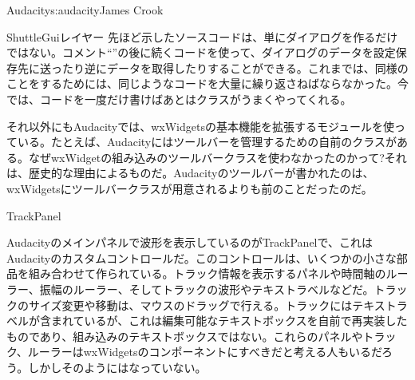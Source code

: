 \begin{aosachapter}{Audacity}{s:audacity}{James Crook}
\begin{aosasect1}{ShuttleGuiレイヤー}
先ほど示したソースコードは、単にダイアログを作るだけではない。コメント``''の後に続くコードを使って、ダイアログのデータを設定保存先に送ったり逆にデータを取得したりすることができる。これまでは、同様のことをするためには、同じようなコードを大量に繰り返さねばならなかった。今では、コードを一度だけ書けばあとはクラスがうまくやってくれる。

それ以外にもAudacityでは、wxWidgetsの基本機能を拡張するモジュールを使っている。たとえば、Audacityにはツールバーを管理するための自前のクラスがある。なぜwxWidgetの組み込みのツールバークラスを使わなかったのかって?それは、歴史的な理由によるものだ。Audacityのツールバーが書かれたのは、wxWidgetsにツールバークラスが用意されるよりも前のことだったのだ。

\end{aosasect1}

\begin{aosasect1}{TrackPanel}

Audacityのメインパネルで波形を表示しているのがTrackPanelで、これはAudacityのカスタムコントロールだ。このコントロールは、いくつかの小さな部品を組み合わせて作られている。トラック情報を表示するパネルや時間軸のルーラー、振幅のルーラー、そしてトラックの波形やテキストラベルなどだ。トラックのサイズ変更や移動は、マウスのドラッグで行える。トラックにはテキストラベルが含まれているが、これは編集可能なテキストボックスを自前で再実装したものであり、組み込みのテキストボックスではない。これらのパネルやトラック、ルーラーはwxWidgetsのコンポーネントにすべきだと考える人もいるだろう。しかしそのようにはなっていない。


\end{aosasect1}
\end{aosachapter}
